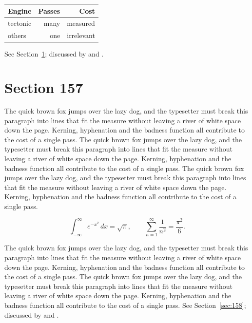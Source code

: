 \documentclass{article}
\begin{document}
\begin{center}
\begin{tabular}{lrr}
\toprule
Engine & Passes & Cost \\
\midrule
tectonic & many & measured \\
others & one & irrelevant \\
\bottomrule
\end{tabular}
\end{center}

See Section~\ref{sec:157}; discussed by \textcite{k2} and \textcite{l4}.
\section{Section 157}
\label{sec:157}
The quick brown fox jumps over the lazy dog, and the typesetter must break this paragraph into lines that fit the measure without leaving a river of white space down the page. Kerning, hyphenation and the badness function all contribute to the cost of a single pass. The quick brown fox jumps over the lazy dog, and the typesetter must break this paragraph into lines that fit the measure without leaving a river of white space down the page. Kerning, hyphenation and the badness function all contribute to the cost of a single pass. The quick brown fox jumps over the lazy dog, and the typesetter must break this paragraph into lines that fit the measure without leaving a river of white space down the page. Kerning, hyphenation and the badness function all contribute to the cost of a single pass. 

\begin{equation}\label{eq:157}
\int_{-\infty}^{\infty} e^{-x^{2}}\,dx = \sqrt{\pi}, \qquad
\sum_{n=1}^{\infty} \frac{1}{n^{2}} = \frac{\pi^{2}}{6}.
\end{equation}

The quick brown fox jumps over the lazy dog, and the typesetter must break this paragraph into lines that fit the measure without leaving a river of white space down the page. Kerning, hyphenation and the badness function all contribute to the cost of a single pass. The quick brown fox jumps over the lazy dog, and the typesetter must break this paragraph into lines that fit the measure without leaving a river of white space down the page. Kerning, hyphenation and the badness function all contribute to the cost of a single pass. 
See Section~\ref{sec:158}; discussed by \textcite{k3} and \textcite{l5}.
\end{document}
